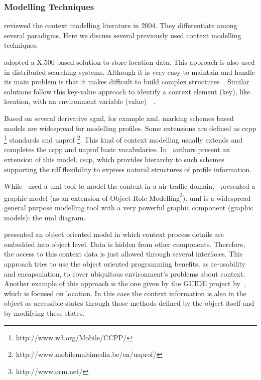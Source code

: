 
\subsubsection{Modelling Techniques}
\label{sec:modelling_techniques}

\citet{strang_context_2004} reviewed the context modelling literature in 2004.
They differentiate among several paradigms. Here we discuss several previously 
used context modelling techniques.



\citet{maass_location_aware_1998} adopted a X.500 based solution to store location 
data. This approach is also used in distributed searching systems. Although it 
is very easy to maintain and handle its main problem is that it makes difficult 
to build complex structures~\citep{strang_context_2004}. Similar solutions follow 
this key-value approach to identify a context element (key), like location, with 
an environment variable (value)~\citep{schilit_customizing_1993}~\citep{voelker_mobisaic_1996}.


Based on several derivative \ac{sgml}, for example \ac{xml}, marking schemes 
based models are widespread for modelling profiles. Some extensions are defined 
as \ac{ccpp} \footnote{http://www.w3.org/Mobile/CCPP/} standards and 
\ac{uaprof} \footnote{http://www.mobilemultimedia.be/en/uaprof/}. This kind of 
context modelling usually extends and completes the \ac{ccpp} and \ac{uaprof} 
basic vocabularies. In~\citep{held_modeling_2002} authors present an extension 
of this model, \ac{cscp}, which provides hierarchy to such schemes supporting 
the \ac{rdf} flexibility to express natural structures of profile information.


While~\citet{bauer_identification_2003} used a \ac{uml} tool to model the context in
a air traffic domain,~\citet{henricksen_generating_2003} presented a graphic model
(as an extension of Object-Role Modelling\footnote{http://www.orm.net/}). 
\ac{uml} is a widespread general purpose modelling tool with a very powerful 
graphic component (graphic models): the \ac{uml} diagram. 


\citet{strang_context_2004} presented an object oriented model in which context
process details are embedded into object level. Data is hidden from other components.
Therefore, the access to this context data is just allowed through several interfaces.
This approach tries to use the object oriented programming benefits, as re-usability
and encapsulation, to cover ubiquitous environment's problems about context. Another
example of this approach is the one given by the GUIDE project by~\citet{cheverst_design_1999},
which is focused on location. In this case the context information is also in the
object as accessible states through those methods defined by the object itself
and by modifying these states.

